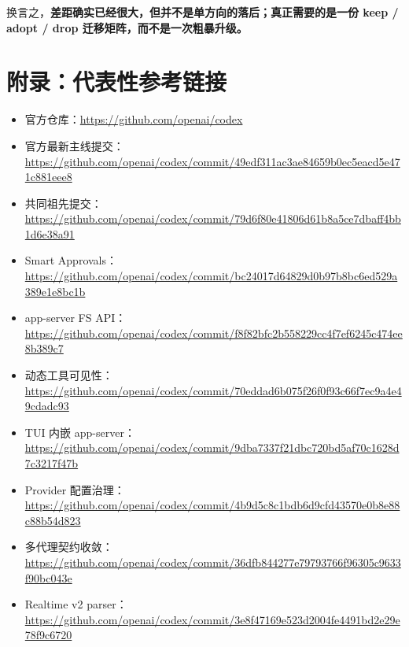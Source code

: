 \documentclass[UTF8,11pt]{ctexart}
\begin{document}
换言之，\textbf{差距确实已经很大，但并不是单方向的落后；真正需要的是一份 keep / adopt / drop 迁移矩阵，而不是一次粗暴升级。}

\section*{附录：代表性参考链接}
\small
\begin{itemize}[nosep]
  \item 官方仓库：\url{https://github.com/openai/codex}
  \item 官方最新主线提交：\url{https://github.com/openai/codex/commit/49edf311ac3ae84659b0ec5eacd5e471c881eee8}
  \item 共同祖先提交：\url{https://github.com/openai/codex/commit/79d6f80e41806d61b8a5ce7dbaff4bb1d6e38a91}
  \item Smart Approvals：\url{https://github.com/openai/codex/commit/bc24017d64829d0b97b8bc6ed529a389e1e8bc1b}
  \item app-server FS API：\url{https://github.com/openai/codex/commit/f8f82bfc2b558229cc4f7ef6245c474ee8b389c7}
  \item 动态工具可见性：\url{https://github.com/openai/codex/commit/70eddad6b075f26f0f93c66f7ec9a4e49cdadc93}
  \item TUI 内嵌 app-server：\url{https://github.com/openai/codex/commit/9dba7337f21dbc720bd5af70c1628d7c3217f47b}
  \item Provider 配置治理：\url{https://github.com/openai/codex/commit/4b9d5c8c1bdb6d9cfd43570e0b8e88c88b54d823}
  \item 多代理契约收敛：\url{https://github.com/openai/codex/commit/36dfb844277e79793766f96305c9633f90bc043e}
  \item Realtime v2 parser：\url{https://github.com/openai/codex/commit/3e8f47169e523d2004fe4491bd2e29e78f9c6720}
\end{itemize}
\end{document}
